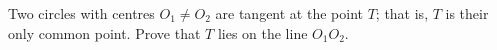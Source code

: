 Two circles with centres $O_1\ne O_2$ are tangent at the point $T$; that is, $T$ is their only common point. Prove that $T$ lies on the line $O_1O_2$.

